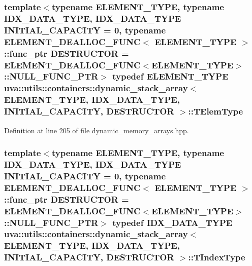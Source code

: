 \subsubsection[{T\+Elem\+Type}]{\setlength{\rightskip}{0pt plus 5cm}template$<$typename E\+L\+E\+M\+E\+N\+T\+\_\+\+T\+Y\+P\+E, typename I\+D\+X\+\_\+\+D\+A\+T\+A\+\_\+\+T\+Y\+P\+E, I\+D\+X\+\_\+\+D\+A\+T\+A\+\_\+\+T\+Y\+P\+E I\+N\+I\+T\+I\+A\+L\+\_\+\+C\+A\+P\+A\+C\+I\+T\+Y = 0, typename E\+L\+E\+M\+E\+N\+T\+\_\+\+D\+E\+A\+L\+L\+O\+C\+\_\+\+F\+U\+N\+C$<$ E\+L\+E\+M\+E\+N\+T\+\_\+\+T\+Y\+P\+E $>$\+::func\+\_\+ptr D\+E\+S\+T\+R\+U\+C\+T\+O\+R = E\+L\+E\+M\+E\+N\+T\+\_\+\+D\+E\+A\+L\+L\+O\+C\+\_\+\+F\+U\+N\+C$<$\+E\+L\+E\+M\+E\+N\+T\+\_\+\+T\+Y\+P\+E$>$\+::\+N\+U\+L\+L\+\_\+\+F\+U\+N\+C\+\_\+\+P\+T\+R$>$ typedef E\+L\+E\+M\+E\+N\+T\+\_\+\+T\+Y\+P\+E {\bf uva\+::utils\+::containers\+::dynamic\+\_\+stack\+\_\+array}$<$ E\+L\+E\+M\+E\+N\+T\+\_\+\+T\+Y\+P\+E, I\+D\+X\+\_\+\+D\+A\+T\+A\+\_\+\+T\+Y\+P\+E, I\+N\+I\+T\+I\+A\+L\+\_\+\+C\+A\+P\+A\+C\+I\+T\+Y, D\+E\+S\+T\+R\+U\+C\+T\+O\+R $>$\+::{\bf T\+Elem\+Type}}\label{classuva_1_1utils_1_1containers_1_1dynamic__stack__array_a28bc953e0b84129b26badd8de1c7708f}


Definition at line 205 of file dynamic\+\_\+memory\+\_\+arrays.\+hpp.

\hypertarget{classuva_1_1utils_1_1containers_1_1dynamic__stack__array_af11e2fba505f2b4c1ddf9babf9a1063c}{}
\subsubsection[{T\+Index\+Type}]{\setlength{\rightskip}{0pt plus 5cm}template$<$typename E\+L\+E\+M\+E\+N\+T\+\_\+\+T\+Y\+P\+E, typename I\+D\+X\+\_\+\+D\+A\+T\+A\+\_\+\+T\+Y\+P\+E, I\+D\+X\+\_\+\+D\+A\+T\+A\+\_\+\+T\+Y\+P\+E I\+N\+I\+T\+I\+A\+L\+\_\+\+C\+A\+P\+A\+C\+I\+T\+Y = 0, typename E\+L\+E\+M\+E\+N\+T\+\_\+\+D\+E\+A\+L\+L\+O\+C\+\_\+\+F\+U\+N\+C$<$ E\+L\+E\+M\+E\+N\+T\+\_\+\+T\+Y\+P\+E $>$\+::func\+\_\+ptr D\+E\+S\+T\+R\+U\+C\+T\+O\+R = E\+L\+E\+M\+E\+N\+T\+\_\+\+D\+E\+A\+L\+L\+O\+C\+\_\+\+F\+U\+N\+C$<$\+E\+L\+E\+M\+E\+N\+T\+\_\+\+T\+Y\+P\+E$>$\+::\+N\+U\+L\+L\+\_\+\+F\+U\+N\+C\+\_\+\+P\+T\+R$>$ typedef I\+D\+X\+\_\+\+D\+A\+T\+A\+\_\+\+T\+Y\+P\+E {\bf uva\+::utils\+::containers\+::dynamic\+\_\+stack\+\_\+array}$<$ E\+L\+E\+M\+E\+N\+T\+\_\+\+T\+Y\+P\+E, I\+D\+X\+\_\+\+D\+A\+T\+A\+\_\+\+T\+Y\+P\+E, I\+N\+I\+T\+I\+A\+L\+\_\+\+C\+A\+P\+A\+C\+I\+T\+Y, D\+E\+S\+T\+R\+U\+C\+T\+O\+R $>$\+::{\bf T\+Index\+Type}}\label{classuva_1_1utils_1_1containers_1_1dynamic__stack__array_af11e2fba505f2b4c1ddf9babf9a1063c}


